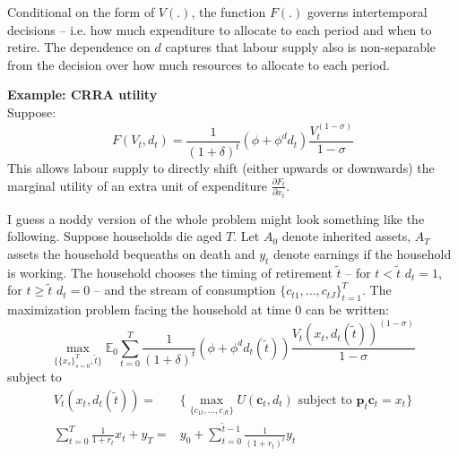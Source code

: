 \documentclass[12pt]{article}
\begin{document}
\noindent Conditional on the form of $V(.)$, the function $F(.)$ governs intertemporal decisions -- i.e. how much expenditure to allocate to each period and when to retire. The dependence on $d$ captures that labour supply also is non-separable from the decision over how much resources to allocate to each period.

\noindent \textbf{Example: CRRA utility}\\
Suppose:
\begin{equation*}
F(V_t,d_t)=\frac{1}{(1+\delta)^t}\left(\phi+\phi^d d_t\right)\frac{V_t^{(1-\sigma)}}{1-\sigma}
\end{equation*}
This allows labour supply to directly shift (either upwards or downwards) the marginal utility of an extra unit of expenditure $\frac{\partial F_t}{\partial x_t}$.
\newline

\noindent I guess a noddy version of the whole problem might look something like the following. Suppose households die aged $T$. Let $A_0$ denote inherited assets, $A_T$ assets the household bequeaths on death and $y_t$ denote earnings if the household is working. The household chooses the timing of retirement $\tilde{t}$ -- for $t<\tilde{t}$ $d_t=1$, for $t\geq\tilde{t}$ $d_t=0$ -- and the stream of consumption $\{c_{t1},...,c_{tJ}\}_{t=1}^{T}$. The maximization problem facing the household at time $0$ can be written:
\begin{equation*}
\max_{\{\{x_s\}_{s=0}^{T},\tilde{t}\}}\mathbb{E}_0\sum_{t=0}^T \frac{1}{(1+\delta)^t}(\phi+\phi^d d_t(\tilde{t}))\frac{V_t(x_t,d_t(\tilde{t}))^{(1-\sigma)}}{1-\sigma}
\end{equation*}
subject to
\begin{align*}
V_t(x_t,d_t(\tilde{t}))=&\bigg\{\max_{\{c_{1t},\dots,c_{Jt}\}}U(\mathbf{c}_t,d_t)\text{ subject to }\mathbf{p}_t\mathbf{c}_t=x_t\bigg\}\\
\sum_{t=0}^{T}\frac{1}{1+r_t}x_t+y_T=&y_0+\sum_{t=0}^{\tilde{t}-1}\frac{1}{(1+r_t)^t}y_t
\end{align*}
\end{document}
